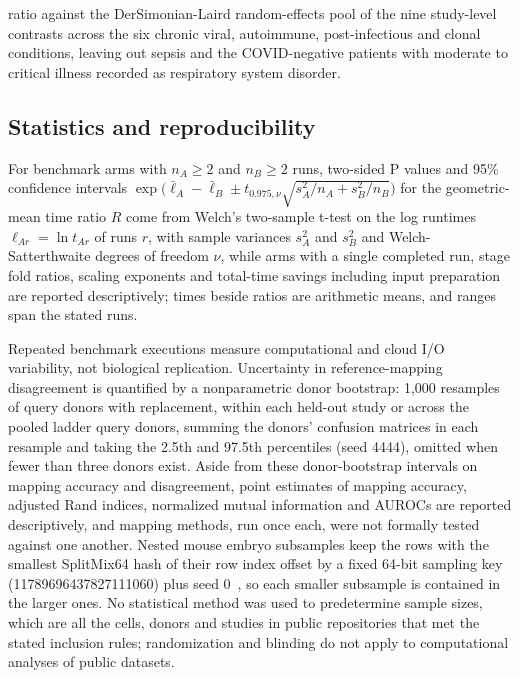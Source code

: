 \documentclass[11pt]{article}
\begin{document}
ratio against the DerSimonian-Laird random-effects pool of the nine study-level contrasts across the six chronic viral, autoimmune, post-infectious and clonal conditions, leaving out sepsis and the COVID-negative patients with moderate to critical illness recorded as respiratory system disorder.

\subsection*{Statistics and reproducibility}\label{sec:Statistics and reproducibility}

For benchmark arms with $n_A\ge2$ and $n_B\ge2$ runs, two-sided P values and 95\% confidence intervals $\exp\bigl(\bar\ell_A-\bar\ell_B\pm t_{0.975,\nu}\sqrt{s_A^{2}/n_A+s_B^{2}/n_B}\bigr)$ for the geometric-mean time ratio $R$ come from Welch's two-sample t-test on the log runtimes $\ell_{Ar}=\ln t_{Ar}$ of runs $r$, with sample variances $s_A^{2}$ and $s_B^{2}$ and Welch-Satterthwaite degrees of freedom $\nu$, while arms with a single completed run, stage fold ratios, scaling exponents and total-time savings including input preparation are reported descriptively; times beside ratios are arithmetic means, and ranges span the stated runs.

Repeated benchmark executions measure computational and cloud I/O variability, not biological replication. Uncertainty in reference-mapping disagreement is quantified by a nonparametric donor bootstrap: 1,000 resamples of query donors with replacement, within each held-out study or across the pooled ladder query donors, summing the donors' confusion matrices in each resample and taking the 2.5th and 97.5th percentiles (seed 4444), omitted when fewer than three donors exist. Aside from these donor-bootstrap intervals on mapping accuracy and disagreement, point estimates of mapping accuracy, adjusted Rand indices, normalized mutual information and AUROCs are reported descriptively, and mapping methods, run once each, were not formally tested against one another. Nested mouse embryo subsamples keep the rows with the smallest SplitMix64 hash of their row index offset by a fixed 64-bit sampling key (11789696437827111060) plus seed 0~\cite{steele2014fast}, so each smaller subsample is contained in the larger ones. No statistical method was used to predetermine sample sizes, which are all the cells, donors and studies in public repositories that met the stated inclusion rules; randomization and blinding do not apply to computational analyses of public datasets.
\end{document}
